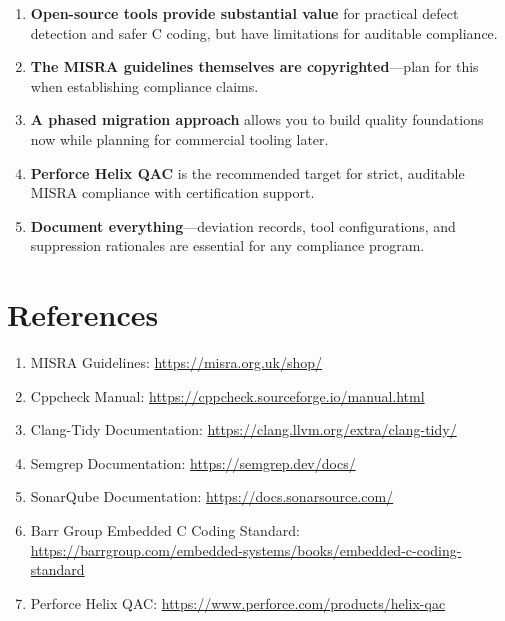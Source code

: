 \documentclass[11pt,letterpaper]{report}
\begin{document}
\begin{enumerate}[leftmargin=*]
    \item \textbf{Open-source tools provide substantial value} for practical defect detection and safer C coding, but have limitations for auditable compliance.

    \item \textbf{The MISRA guidelines themselves are copyrighted}---plan for this when establishing compliance claims.

    \item \textbf{A phased migration approach} allows you to build quality foundations now while planning for commercial tooling later.

    \item \textbf{Perforce Helix QAC} is the recommended target for strict, auditable MISRA compliance with certification support.

    \item \textbf{Document everything}---deviation records, tool configurations, and suppression rationales are essential for any compliance program.
\end{enumerate}

\appendix
\chapter{References}

\begin{enumerate}[leftmargin=*]
    \item MISRA Guidelines: \url{https://misra.org.uk/shop/}
    \item Cppcheck Manual: \url{https://cppcheck.sourceforge.io/manual.html}
    \item Clang-Tidy Documentation: \url{https://clang.llvm.org/extra/clang-tidy/}
    \item Semgrep Documentation: \url{https://semgrep.dev/docs/}
    \item SonarQube Documentation: \url{https://docs.sonarsource.com/}
    \item Barr Group Embedded C Coding Standard: \url{https://barrgroup.com/embedded-systems/books/embedded-c-coding-standard}
    \item Perforce Helix QAC: \url{https://www.perforce.com/products/helix-qac}
\end{enumerate}
\end{document}
